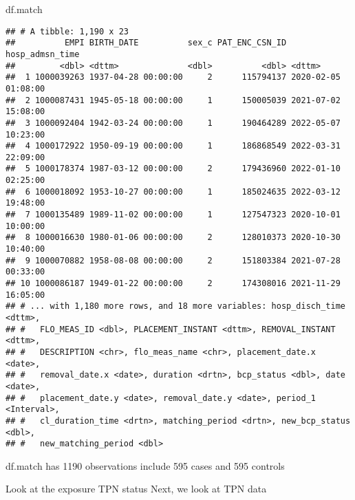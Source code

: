 \documentclass[
]{article}
\newenvironment{Shaded}{\begin{snugshade}}{\end{snugshade}}
\newcommand{\NormalTok}[1]{#1}
\begin{document}
\begin{Shaded}
\begin{Highlighting}[]
\NormalTok{df.match}
\end{Highlighting}
\end{Shaded}

\begin{verbatim}
## # A tibble: 1,190 x 23
##          EMPI BIRTH_DATE          sex_c PAT_ENC_CSN_ID hosp_admsn_time    
##         <dbl> <dttm>              <dbl>          <dbl> <dttm>             
##  1 1000039263 1937-04-28 00:00:00     2      115794137 2020-02-05 01:08:00
##  2 1000087431 1945-05-18 00:00:00     1      150005039 2021-07-02 15:08:00
##  3 1000092404 1942-03-24 00:00:00     1      190464289 2022-05-07 10:23:00
##  4 1000172922 1950-09-19 00:00:00     1      186868549 2022-03-31 22:09:00
##  5 1000178374 1987-03-12 00:00:00     2      179436960 2022-01-10 02:25:00
##  6 1000018092 1953-10-27 00:00:00     1      185024635 2022-03-12 19:48:00
##  7 1000135489 1989-11-02 00:00:00     1      127547323 2020-10-01 10:00:00
##  8 1000016630 1980-01-06 00:00:00     2      128010373 2020-10-30 10:40:00
##  9 1000070882 1958-08-08 00:00:00     2      151803384 2021-07-28 00:33:00
## 10 1000086187 1949-01-22 00:00:00     2      174308016 2021-11-29 16:05:00
## # ... with 1,180 more rows, and 18 more variables: hosp_disch_time <dttm>,
## #   FLO_MEAS_ID <dbl>, PLACEMENT_INSTANT <dttm>, REMOVAL_INSTANT <dttm>,
## #   DESCRIPTION <chr>, flo_meas_name <chr>, placement_date.x <date>,
## #   removal_date.x <date>, duration <drtn>, bcp_status <dbl>, date <date>,
## #   placement_date.y <date>, removal_date.y <date>, period_1 <Interval>,
## #   cl_duration_time <drtn>, matching_period <drtn>, new_bcp_status <dbl>,
## #   new_matching_period <dbl>
\end{verbatim}

df.match has 1190 observations include 595 cases and 595 controls

Look at the exposure TPN status Next, we look at TPN data
\end{document}

